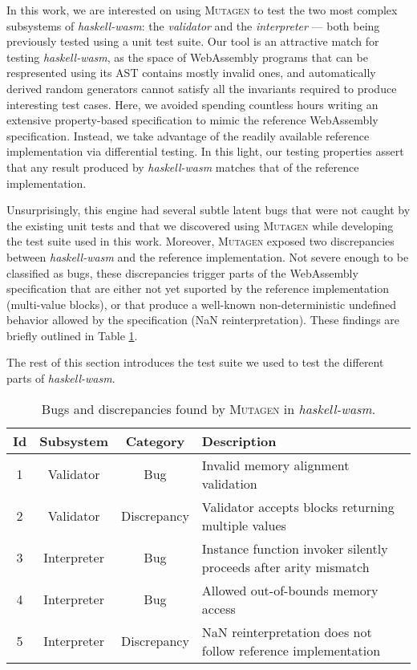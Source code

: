 \documentclass[acmsmall, anonymous]{acmart}
\newcommand{\mutagen}{\textsc{Mutagen}\xspace}
\begin{document}
In this work, we are interested on using \mutagen to test the two most complex
subsystems of \textit{haskell-wasm}: the \emph{validator} and the
\emph{interpreter} --- both being previously tested using a unit test suite.
%
Our tool is an attractive match for testing \textit{haskell-wasm}, as the space
of WebAssembly programs that can be respresented using its AST contains mostly
invalid ones, and automatically derived random generators cannot satisfy all the
invariants required to produce interesting test cases.
%
Here, we avoided spending countless hours writing an extensive property-based
specification to mimic the reference WebAssembly specification.
%
Instead, we take advantage of the readily available reference implementation via
differential testing.
%
In this light, our testing properties assert that any result produced by
\textit{haskell-wasm} matches that of the reference implementation.


Unsurprisingly, this engine had several subtle latent bugs that were not caught
by the existing unit tests and that we discovered using \mutagen while
developing the test suite used in this work.
%
Moreover, \mutagen exposed two discrepancies between \textit{haskell-wasm} and
the reference implementation.
%
Not severe enough to be classified as bugs, these discrepancies trigger parts of
the WebAssembly specification that are either not yet suported by the reference
implementation (multi-value blocks), or that produce a well-known
non-deterministic undefined behavior allowed by the specification (NaN
reinterpretation).
%
These findings are briefly outlined in Table \ref{table:wasm:bugs}.

The rest of this section introduces the test suite we used to test the different
parts of \textit{haskell-wasm}.


\begin{table}[b]
\footnotesize
\begin{tabular}{|c|c|c|l|}
\hline
\textbf{Id}
& \textbf{Subsystem}
& \textbf{Category}
& \textbf{Description} \\
\hline
1
& Validator
& Bug
& Invalid memory alignment validation \\
\hline
2
& Validator
& Discrepancy
& Validator accepts blocks returning multiple values  \\
\hline
3
& Interpreter
& Bug
& Instance function invoker silently proceeds after arity mismatch \\
\hline
4
& Interpreter
& Bug
& Allowed out-of-bounds memory access \\
\hline
5
& Interpreter
& Discrepancy
& NaN reinterpretation does not follow reference implementation\\
\hline
\end{tabular}
\caption{\label{table:wasm:bugs}Bugs and discrepancies found by \mutagen in
  \textit{haskell-wasm}.}
\end{table}
\end{document}
